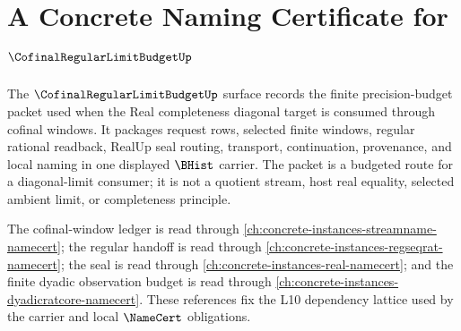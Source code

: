 \chapter{A Concrete Naming Certificate for $\CofinalRegularLimitBudgetUp$}
\label{ch:concrete-instances-cofinalregularlimitbudget-namecert}

The $\CofinalRegularLimitBudgetUp$ surface records the finite precision-budget packet used when the Real completeness diagonal target is consumed through cofinal windows. It packages request rows, selected finite windows, regular rational readback, RealUp seal routing, transport, continuation, provenance, and local naming in one displayed $\BHist$ carrier. The packet is a budgeted route for a diagonal-limit consumer; it is not a quotient stream, host real equality, selected ambient limit, or completeness principle.

The cofinal-window ledger is read through \autoref{ch:concrete-instances-streamname-namecert}; the regular handoff is read through \autoref{ch:concrete-instances-regseqrat-namecert}; the seal is read through \autoref{ch:concrete-instances-real-namecert}; and the finite dyadic observation budget is read through \autoref{ch:concrete-instances-dyadicratcore-namecert}. These references fix the L10 dependency lattice used by the carrier and local $\NameCert$ obligations.



